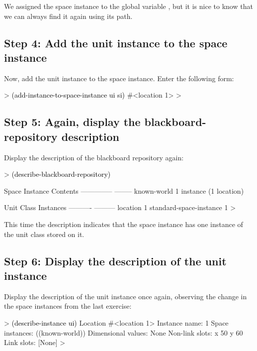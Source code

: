 \documentclass[10pt,twoside,english,pdftex]{article}
\begin{document}
We assigned the  space instance to the global variable
, but it is nice to know that we can always find it again using its
path.

\subsection*{Step 4: Add the unit instance to the space instance}

%
%
Now, add the  unit instance to the space instance.
Enter the following form:
%
\begin{example}\color{darkergray}%
  > \textcolor{black}{(add-instance-to-space-instance ui si)}
  #<location 1>
  >
\end{example}

\subsection*{Step 5: Again, display the blackboard-repository description}

%
Display the description of the blackboard repository again:
%
\begin{example}\color{darkergray}%
  > \textcolor{black}{(describe-blackboard-repository)}
  
  Space Instance                Contents
  --------------                --------
  known-world                   1 instance (1 location)

  Unit Class                    Instances
  ----------                    ---------
  location                              1
  standard-space-instance               1
  >
\end{example}

This time the description indicates that the  space instance
has one instance of the  unit class stored on it.

\subsection*{Step 6: Display the description of the unit instance}

%
Display the description of the  unit instance once again,
observing the change in the space instances from the last exercise:
%
\begin{example}\color{darkergray}%
  > \textcolor{black}{(describe-instance ui)}
  Location #<location 1>
    Instance name: 1
    Space instances: ((known-world))
    Dimensional values: None
    Non-link slots:
      x 50
      y 60
    Link slots:
      [None]
  >
\end{example}
\end{document}
